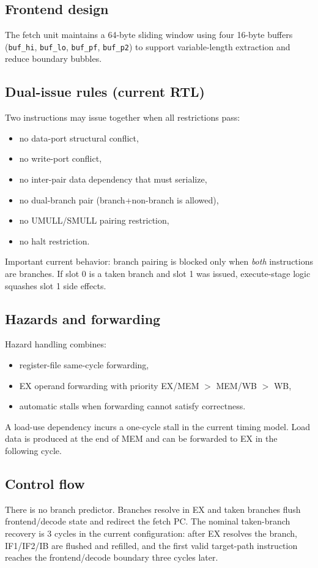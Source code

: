 \documentclass[11pt]{article}
\begin{document}
\subsection{Frontend design}
The fetch unit maintains a 64-byte sliding window using four 16-byte buffers (\texttt{buf\_hi}, \texttt{buf\_lo}, \texttt{buf\_pf}, \texttt{buf\_p2}) to support variable-length extraction and reduce boundary bubbles.

\subsection{Dual-issue rules (current RTL)}
Two instructions may issue together when all restrictions pass:
\begin{itemize}[leftmargin=*]
  \item no data-port structural conflict,
  \item no write-port conflict,
  \item no inter-pair data dependency that must serialize,
  \item no dual-branch pair (branch+non-branch is allowed),
  \item no UMULL/SMULL pairing restriction,
  \item no halt restriction.
\end{itemize}

Important current behavior: branch pairing is blocked only when \emph{both} instructions are branches. If slot 0 is a taken branch and slot 1 was issued, execute-stage logic squashes slot 1 side effects.

\subsection{Hazards and forwarding}
Hazard handling combines:
\begin{itemize}[leftmargin=*]
  \item register-file same-cycle forwarding,
  \item EX operand forwarding with priority EX/MEM $>$ MEM/WB $>$ WB,
  \item automatic stalls when forwarding cannot satisfy correctness.
\end{itemize}
A load-use dependency incurs a one-cycle stall in the current timing model. Load data is produced at the end of MEM and can be forwarded to EX in the following cycle.

\subsection{Control flow}
There is no branch predictor. Branches resolve in EX and taken branches flush frontend/decode state and redirect the fetch PC. The nominal taken-branch recovery is 3 cycles in the current configuration: after EX resolves the branch, IF1/IF2/IB are flushed and refilled, and the first valid target-path instruction reaches the frontend/decode boundary three cycles later.
\end{document}
